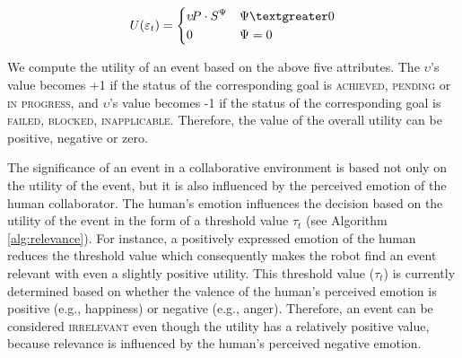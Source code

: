 \documentclass{article}
\begin{document}
\vspace*{-3mm}
\begin{equation}
    U(\varepsilon_t)= 
    \begin{dcases}
       \upsilon\!P\cdot S^{\Psi} & \Psi \textgreater 0 \\
       0               			 & \Psi = 0
    \end{dcases}
    \label{eqn:utility}
\end{equation}

We compute the utility of an event based on the above five attributes. The
$\upsilon$'s value becomes +1 if the status of the corresponding goal is
\textsc{achieved}, \textsc{pending} or \textsc{in progress}, and $\upsilon$'s
value becomes -1 if the status of the corresponding goal is \textsc{failed,
blocked, inapplicable}. Therefore, the value of the overall utility can be
positive, negative or zero.

The significance of an event in a collaborative environment is based not
only on the utility of the event, but it is also influenced by the perceived
emotion of the human collaborator. The human's emotion influences the decision
based on the utility of the event in the form of a threshold value $\tau_{t}$
(see Algorithm \ref{alg:relevance}). For instance, a positively expressed
emotion of the human reduces the threshold value which consequently makes the
robot find an event relevant with even a slightly positive utility. This
threshold value ($\tau_{t}$) is currently determined based on whether the
valence of the human's perceived emotion is positive (e.g., happiness) or
negative (e.g., anger). Therefore, an event can be considered
\textsc{irrelevant} even though the utility has a relatively positive value,
because relevance is influenced by the human's perceived negative emotion.
\end{document}
